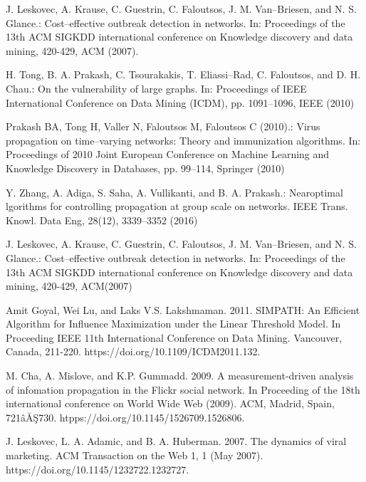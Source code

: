 \begin{thebibliography}{4}
	 J. Leskovec, A. Krause, C. Guestrin, C. Faloutsos, J. M. Van–Briesen, and N. S. Glance.: Cost–effective outbreak detection in networks. In: Proceedings of the 13th ACM SIGKDD international conference on Knowledge discovery and data mining, 420-429, ACM (2007).
	
	 H. Tong, B. A. Prakash, C. Tsourakakis, T. Eliassi--Rad, C. Faloutsos, and D. H. Chau.: On the vulnerability of large graphs. In: Proceedings of IEEE International Conference on  Data Mining  (ICDM), pp. 1091--1096, IEEE (2010)
	
	 Prakash BA, Tong H, Valler N, Faloutsos M, Faloutsos C (2010).: Virus propagation on time--varying networks: Theory and immunization algorithms. In: Proceedings of 2010 Joint European Conference on Machine Learning and Knowledge Discovery in Databases, pp. 99--114, Springer (2010)
	
	 Y. Zhang, A. Adiga, S. Saha, A. Vullikanti, and B. A. Prakash.: Nearoptimal lgorithms for controlling propagation at group scale on networks. IEEE Trans. Knowl. Data Eng, 28(12), 3339--3352 (2016)
	
	 J. Leskovec, A. Krause, C. Guestrin, C. Faloutsos, J. M. Van--Briesen, and N. S. Glance.: Cost--effective outbreak detection in networks. In: Proceedings of the 13th ACM SIGKDD international conference on Knowledge discovery and data mining, 420-429, ACM(2007)
	
	
	 Amit Goyal, Wei Lu, and Laks V.S. Lakshmaman. 2011. SIMPATH: An Efficient Algorithm for Influence Maximization under the Linear Threshold Model. In Proceeding IEEE 11th International Conference on Data Mining. Vancouver, Canada, 211-220. https://doi.org/10.1109/ICDM2011.132.
	
	 M. Cha, A. Mislove, and K.P. Gummadd. 2009. A measurement-driven analysis of infomation propagation in the Flickr social network. In Proceeding of the 18th international conference on World Wide Web (2009). ACM, Madrid, Spain, 721âĂŞ730. htpps://doi.org/10.1145/1526709.1526806.
	
	 J. Leskovec, L. A. Adamic, and B. A. Huberman. 2007. The dynamics of viral marketing. ACM Transaction on the Web 1, 1 (May 2007). https://doi.org/10.1145/1232722.1232727. 
	
	
	
\end{thebibliography}